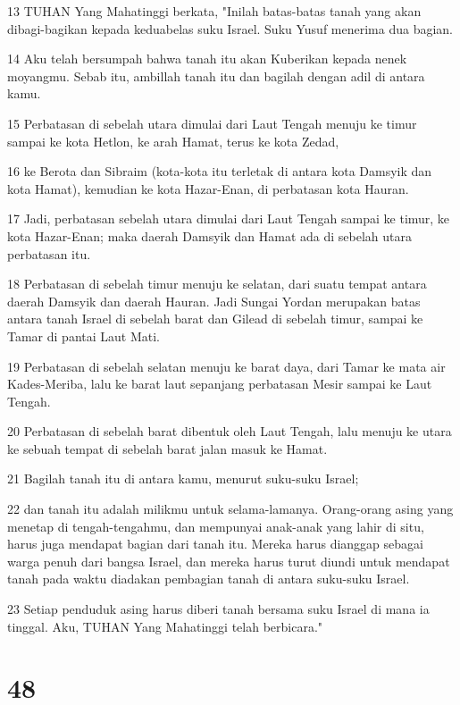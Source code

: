 \par 13 TUHAN Yang Mahatinggi berkata, "Inilah batas-batas tanah yang akan dibagi-bagikan kepada keduabelas suku Israel. Suku Yusuf menerima dua bagian.
\par 14 Aku telah bersumpah bahwa tanah itu akan Kuberikan kepada nenek moyangmu. Sebab itu, ambillah tanah itu dan bagilah dengan adil di antara kamu.
\par 15 Perbatasan di sebelah utara dimulai dari Laut Tengah menuju ke timur sampai ke kota Hetlon, ke arah Hamat, terus ke kota Zedad,
\par 16 ke Berota dan Sibraim (kota-kota itu terletak di antara kota Damsyik dan kota Hamat), kemudian ke kota Hazar-Enan, di perbatasan kota Hauran.
\par 17 Jadi, perbatasan sebelah utara dimulai dari Laut Tengah sampai ke timur, ke kota Hazar-Enan; maka daerah Damsyik dan Hamat ada di sebelah utara perbatasan itu.
\par 18 Perbatasan di sebelah timur menuju ke selatan, dari suatu tempat antara daerah Damsyik dan daerah Hauran. Jadi Sungai Yordan merupakan batas antara tanah Israel di sebelah barat dan Gilead di sebelah timur, sampai ke Tamar di pantai Laut Mati.
\par 19 Perbatasan di sebelah selatan menuju ke barat daya, dari Tamar ke mata air Kades-Meriba, lalu ke barat laut sepanjang perbatasan Mesir sampai ke Laut Tengah.
\par 20 Perbatasan di sebelah barat dibentuk oleh Laut Tengah, lalu menuju ke utara ke sebuah tempat di sebelah barat jalan masuk ke Hamat.
\par 21 Bagilah tanah itu di antara kamu, menurut suku-suku Israel;
\par 22 dan tanah itu adalah milikmu untuk selama-lamanya. Orang-orang asing yang menetap di tengah-tengahmu, dan mempunyai anak-anak yang lahir di situ, harus juga mendapat bagian dari tanah itu. Mereka harus dianggap sebagai warga penuh dari bangsa Israel, dan mereka harus turut diundi untuk mendapat tanah pada waktu diadakan pembagian tanah di antara suku-suku Israel.
\par 23 Setiap penduduk asing harus diberi tanah bersama suku Israel di mana ia tinggal. Aku, TUHAN Yang Mahatinggi telah berbicara."

\chapter{48}

